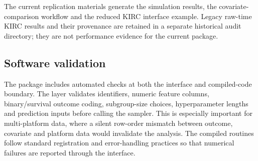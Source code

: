 \documentclass[article]{jss}
\begin{document}
The current replication materials generate the simulation results, the
covariate-comparison workflow and the reduced KIRC interface example. Legacy
raw-time KIRC results and their provenance are retained in a separate historical
audit directory; they are not performance evidence for the current package.

\FloatBarrier

\subsection{Software validation}\label{sec:software-validation}

The package includes automated checks at both the  interface and
compiled-code boundary.  The  layer validates identifiers, numeric
feature columns, binary/survival outcome coding, subgroup-size choices,
hyperparameter lengths and prediction inputs before calling the sampler.  This
is especially important for multi-platform data, where a silent row-order
mismatch between outcome, covariate and platform data would invalidate the
analysis.  The compiled routines follow standard  registration and
error-handling practices so that numerical failures are reported through the
 interface.
\end{document}
